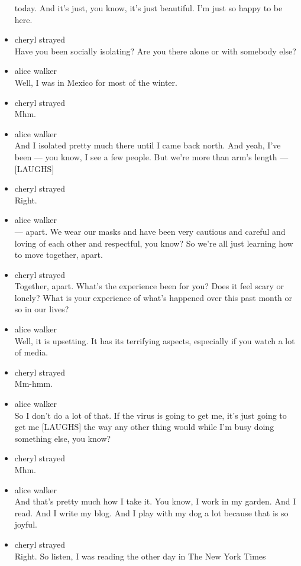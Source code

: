 \begin{itemize}
  today. And it's just, you know, it's just beautiful. I'm just so happy
  to be here.
\item
  cheryl strayed\\
  Have you been socially isolating? Are you there alone or with somebody
  else?
\item
  alice walker\\
  Well, I was in Mexico for most of the winter.
\item
  cheryl strayed\\
  Mhm.
\item
  alice walker\\
  And I isolated pretty much there until I came back north. And yeah,
  I've been --- you know, I see a few people. But we're more than arm's
  length --- {[}LAUGHS{]}
\item
  cheryl strayed\\
  Right.
\item
  alice walker\\
  --- apart. We wear our masks and have been very cautious and careful
  and loving of each other and respectful, you know? So we're all just
  learning how to move together, apart.
\item
  cheryl strayed\\
  Together, apart. What's the experience been for you? Does it feel
  scary or lonely? What is your experience of what's happened over this
  past month or so in our lives?
\item
  alice walker\\
  Well, it is upsetting. It has its terrifying aspects, especially if
  you watch a lot of media.
\item
  cheryl strayed\\
  Mm-hmm.
\item
  alice walker\\
  So I don't do a lot of that. If the virus is going to get me, it's
  just going to get me {[}LAUGHS{]} the way any other thing would while
  I'm busy doing something else, you know?
\item
  cheryl strayed\\
  Mhm.
\item
  alice walker\\
  And that's pretty much how I take it. You know, I work in my garden.
  And I read. And I write my blog. And I play with my dog a lot because
  that is so joyful.
\item
  cheryl strayed\\
  Right. So listen, I was reading the other day in The New York Times

\end{itemize}

